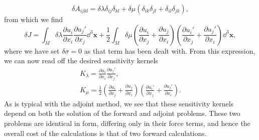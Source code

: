 \documentclass[a4paper,10pt]{paper}
\begin{document}
\begin{enumerate}
\begin{equation*}
    \delta A_{ijkl}=\delta\lambda\delta_{ij}\delta_{kl}+\delta\mu(\delta_{ik}\delta_{jl}+\delta_{il}\delta_{jk}),
\end{equation*}
from which we find
\begin{equation*}
    \delta J=\int_{M}\delta\lambda\frac{\partial u_{i}}{\partial x_{i}}\frac{\partial u_{j}'}{\partial x_{j}}\dd^{3}\mathbf{x}+\frac{1}{2}\int_{M}\delta\mu\left(\frac{\partial u_{i}}{\partial x_{j}}+\frac{\partial u_{j}}{\partial x_{i}}\right)\left(\frac{\partial u_{i}'}{\partial x_{j}}+\frac{\partial u_{j}'}{\partial x_{i}}\right)\dd^{3}\mathbf{x},
\end{equation*}
where we have set $\delta\sigma=0$ as that term has been dealt with. From this expression, we can now read off the desired sensitivity kernels
\begin{gather*}
    K_{\lambda}=\frac{\partial u_{i}}{\partial x_{i}}\frac{\partial u_{j}'}{\partial x_{j}}, \\
    K_{\mu}=\frac{1}{2}\left(\frac{\partial u_{i}}{\partial x_{j}}+\frac{\partial u_{j}}{\partial x_{i}}\right)\left(\frac{\partial u_{i}'}{\partial x_{j}}+\frac{\partial u_{j}'}{\partial x_{i}}\right).
\end{gather*}
As is typical with the adjoint method, we see that these sensitivity kernels depend on both the solution of the forward and adjoint problems. These two problems are identical in form, differing only in their force terms, and hence the overall cost of the calculations is that of two forward calculations.




\end{enumerate}
\end{document}
